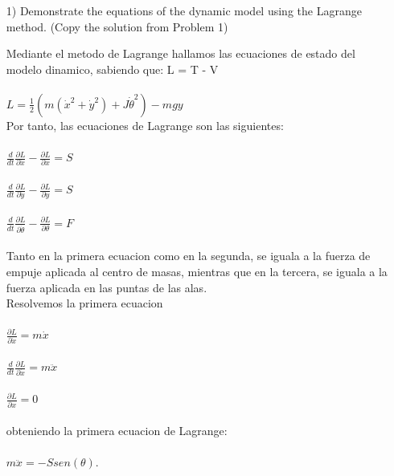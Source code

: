 \documentclass{article}
\begin{document}
\begin{itemize}

\item[1)] 
{\color{gray}
Demonstrate the equations of the dynamic model using the Lagrange method. (Copy the solution from Problem 1)
}

\bigskip

Mediante el metodo de Lagrange hallamos las ecuaciones de estado del modelo dinamico, sabiendo que: L = T - V\\\\
		$L = \frac{1}{2}(m(\dot{x}^2+\dot{y}^2)+J\dot{\theta}^2) - mgy$\\

Por tanto, las ecuaciones de Lagrange son las siguientes:\\\\
		$\frac{d}{dt}\frac{\partial L}{\partial \dot{x}} - \frac{\partial L}{\partial x} = S$\\\\
		$\frac{d}{dt}\frac{\partial L}{\partial \dot{y}} - \frac{\partial L}{\partial y} = S$\\\\
		$\frac{d}{dt}\frac{\partial L}{\partial \dot{\theta}} - \frac{\partial L}{\partial \theta} = F$\\\\

Tanto en la primera ecuacion como en la segunda, se iguala a la fuerza de empuje aplicada al centro de masas, mientras que en la tercera, se iguala a la fuerza aplicada en las puntas de las alas.\\

Resolvemos la primera ecuacion\\\\
		$\frac{\partial L}{\partial \dot{x}} = m\dot{x}$\\\\
		$\frac{d}{dt}\frac{\partial L}{\partial \dot{x}} = m\ddot{x}$\\\\
		$\frac{\partial L}{\partial x} = 0$\\\\
obteniendo la primera ecuacion de Lagrange:\\\\
		$m\ddot{x} = -S sen(\theta)$.\\


\end{itemize}
\end{document}
